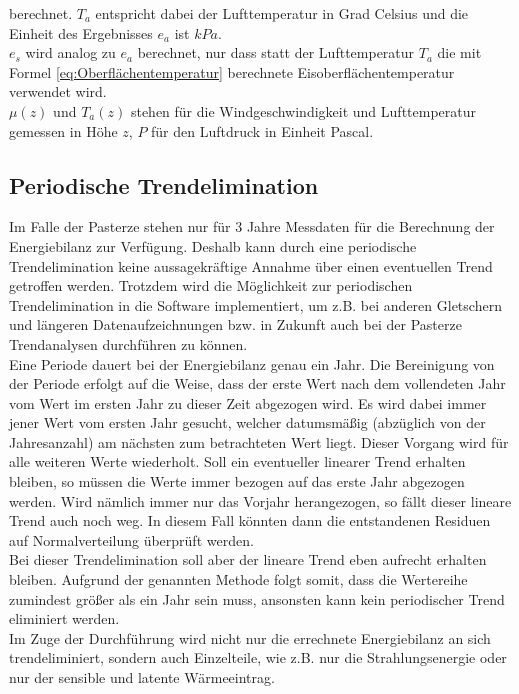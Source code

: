 \documentclass[11pt,a4paper]{article}
\begin{document}
berechnet. $T_a$ entspricht dabei der Lufttemperatur in Grad Celsius und die Einheit des Ergebnisses $e_a$ ist $kPa$.\\

$e_s$ wird analog zu $e_a$ berechnet, nur dass statt der Lufttemperatur $T_a$ die mit Formel \ref{eq:Oberflächentemperatur} berechnete Eisoberflächentemperatur verwendet wird.\\
$\mu(z)$ und $T_a(z)$ stehen für die Windgeschwindigkeit und Lufttemperatur gemessen in Höhe $z$, $P$ für den Luftdruck in Einheit Pascal.


\subsection{Periodische Trendelimination}\label{Periodische Trendelimination}
Im Falle der Pasterze stehen nur für 3 Jahre Messdaten für die Berechnung der Energiebilanz zur Verfügung. Deshalb kann durch eine periodische Trendelimination keine aussagekräftige Annahme über einen eventuellen Trend getroffen werden. Trotzdem wird die Möglichkeit zur periodischen Trendelimination in die Software implementiert, um z.B. bei anderen Gletschern und längeren Datenaufzeichnungen bzw. in Zukunft auch bei der Pasterze Trendanalysen durchführen zu können.\\

Eine Periode dauert bei der Energiebilanz genau ein Jahr. Die Bereinigung von der Periode erfolgt auf die Weise, dass der erste Wert nach dem vollendeten Jahr vom Wert im ersten Jahr zu dieser Zeit abgezogen wird. Es wird dabei immer jener Wert vom ersten Jahr gesucht, welcher datumsmäßig (abzüglich von der Jahresanzahl) am nächsten zum betrachteten Wert liegt. Dieser Vorgang wird für alle weiteren Werte wiederholt. Soll ein eventueller linearer Trend erhalten bleiben, so müssen die Werte immer bezogen auf das erste Jahr abgezogen werden. Wird nämlich immer nur das Vorjahr herangezogen, so fällt dieser lineare Trend auch noch weg. In diesem Fall könnten dann die entstandenen Residuen auf Normalverteilung überprüft werden.\\
Bei dieser Trendelimination soll aber der lineare Trend eben aufrecht erhalten bleiben. Aufgrund der genannten Methode folgt somit, dass die Wertereihe zumindest größer als ein Jahr sein muss, ansonsten kann kein periodischer Trend eliminiert werden.\\

Im Zuge der Durchführung wird nicht nur die errechnete Energiebilanz an sich trendeliminiert, sondern auch Einzelteile, wie z.B. nur die Strahlungsenergie oder nur der sensible und latente Wärmeeintrag.
\end{document}
